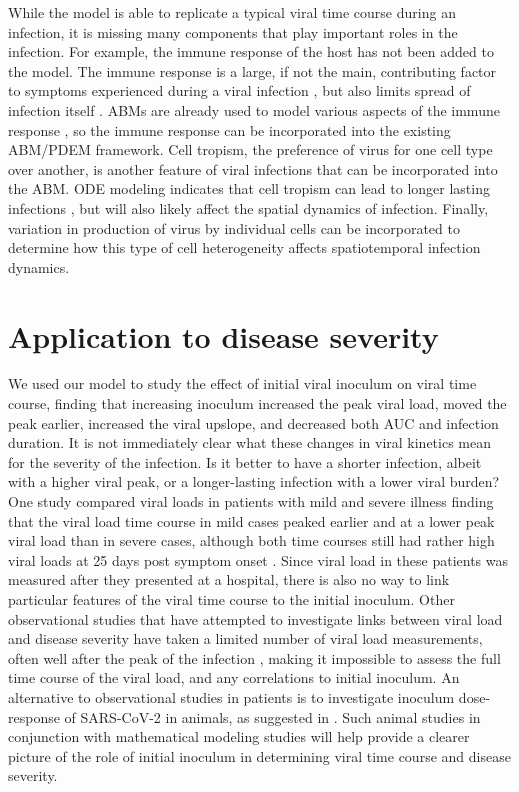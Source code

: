 While the model is able to replicate a typical viral time course during an infection, it is missing many components that play important roles in the infection. For example, the immune response of the host has not been added to the model. The immune response is a large, if not the main, contributing factor to symptoms experienced during a viral infection \citep{manchanda14,zheng18}, but also limits spread of infection itself \citep{dobrovolny13}. ABMs are already used to model various aspects of the immune response \citep{whitman20,kerepesi19,levin16}, so the immune response can be incorporated into the existing ABM/PDEM framework. Cell tropism, the preference of virus for one cell type over another, is another feature of viral infections that can be incorporated into the ABM. ODE modeling indicates that cell tropism can lead to longer lasting infections \citep{dobrovolny10}, but will also likely affect the spatial dynamics of infection. Finally, variation in production of virus by individual cells \citep{timm12} can be incorporated to determine how this type of cell heterogeneity affects spatiotemporal infection dynamics.


\section{Application to disease severity}

We used our model to study the effect of initial viral inoculum on viral time course, finding that increasing inoculum increased the peak viral load, moved the peak earlier, increased the viral upslope, and decreased both AUC and infection duration. It is not immediately clear what these changes in viral kinetics mean for the severity of the infection. Is it better to have a shorter infection, albeit with a higher viral peak, or a longer-lasting infection with a lower viral burden? One study compared viral loads in patients with mild and severe illness finding that the viral load time course in mild cases peaked earlier and at a lower peak viral load than in severe cases, although both time courses still had rather high viral loads at 25 days post symptom onset \citep{zheng20}. Since viral load in these patients was measured after they presented at a hospital, there is also no way to link particular features of the viral time course to the initial inoculum. Other observational studies that have attempted to investigate links between viral load and disease severity have taken a limited number of viral load measurements, often well after the peak of the infection \citep{liu20, liu20imm,to20}, making it impossible to assess the full time course of the viral load, and any correlations to initial inoculum. An alternative to observational studies in patients is to investigate inoculum dose-response of SARS-CoV-2 in animals, as suggested in \citep{little20}. Such animal studies in conjunction with mathematical modeling studies will help provide a clearer picture of the role of initial inoculum in determining viral time course and disease severity.

